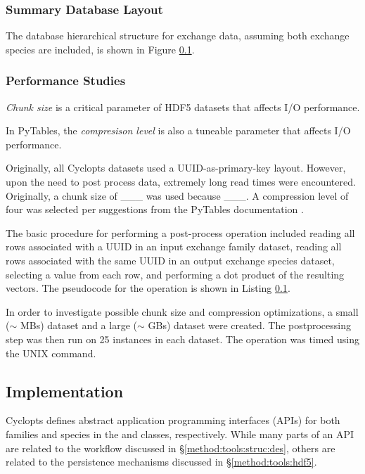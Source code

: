 
\subsubsection{Summary Database Layout}

The database hierarchical structure for exchange data, assuming both exchange
species are included, is shown in Figure \ref{}.

\subsubsection{Performance Studies}\label{method:tools:hdf5:study}

\textit{Chunk size} is a critical parameter of HDF5 datasets that affects I/O
performance.

In PyTables, the \textit{compresison level} is also a tuneable parameter that
affects I/O performance.

 Originally, all Cyclopts datasets used a UUID-as-primary-key
layout. However, upon the need to post process data, extremely long read times
were encountered. Originally, a chunk size of ___ was used because ___. A
compression level of four was selected per suggestions from the PyTables
documentation \cite{}.

The basic procedure for performing a post-process operation included reading all
rows associated with a UUID in an input exchange family dataset, reading all
rows associated with the same UUID in an output exchange species dataset,
selecting a value from each row, and performing a dot product of the resulting
vectors. The pseudocode for the operation is shown in Listing \ref{}.

In order to investigate possible chunk size and compression optimizations, a
small ($\sim$ MBs) dataset and a large ($\sim$ GBs) dataset were created. The
postprocessing step was then run on 25 instances in each dataset. The operation
was timed using the UNIX  command.



\subsection{Implementation}

Cyclopts defines abstract application programming interfaces (APIs) for both
families and species in the  and 
classes, respectively. While many parts of an API are related to the workflow
discussed in \S \ref{method:tools:struc:des}, others are related to the
persistence mechanisms discussed in \S \ref{method:tools:hdf5}.

